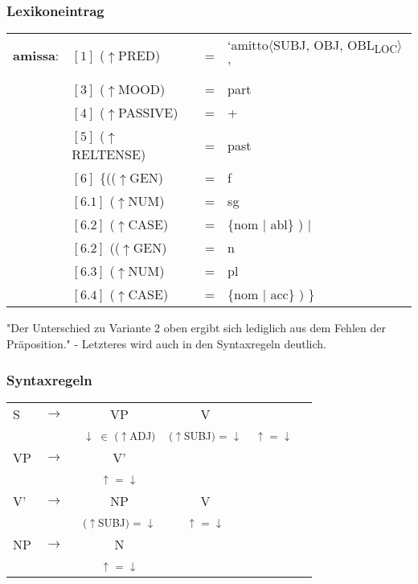 \documentclass[12pt,a4paper]{article}
\begin{document}
\subsubsection{Lexikoneintrag}
\begin{singlespace}
\begin{tabular}{ l  l  l  l  } 
\textbf{amissa}: & $[1]$ \:  ($\uparrow$PRED) & = & `amitto$\langle$SUBJ, OBJ, OBL\textsubscript{LOC}$\rangle$'\\
$\qquad$ & $[3]$ \:  ($\uparrow$MOOD) & = & part\\
$\qquad$ & $[4]$ \:  ($\uparrow$PASSIVE) & = & + \\
$\qquad$ & $[5]$ \:  ($\uparrow$RELTENSE) & = & past \\
$\qquad$ & $[6]$ \:  \{(($\uparrow$GEN) & = & f \\ 
$\qquad$ & $[6.1]$ \:  ($\uparrow$NUM) & = & sg \\
$\qquad$ & $[6.2]$ \:  ($\uparrow$CASE) & = & \{nom $\mid$ abl\} ) $\mid$\\
$\qquad$ & $[6.2]$ \: (($\uparrow$GEN) & = & n \\
$\qquad$ & $[6.3]$ \:  ($\uparrow$NUM) & = & pl \\
$\qquad$ & $[6.4]$ \:  ($\uparrow$CASE) & = & \{nom $\mid$ acc\} ) \}\\
\end{tabular}
\newline
\newline
\end{singlespace}

"Der Unterschied zu Variante 2 oben ergibt sich lediglich aus dem Fehlen der Präposition." - Letzteres wird auch in den Syntaxregeln deutlich.

\subsubsection{Syntaxregeln}
\begin{singlespace}
\begin{tabular}{ l  l  c  c  c  c }
  S & $\rightarrow$ & VP & V\\
   & $\qquad$ & \textsuperscript{$\downarrow$ $\in$ ($\uparrow$ADJ)} & \textsuperscript{($\uparrow$SUBJ) = $\downarrow$} & \textsuperscript{$\uparrow$ = $\downarrow$} \\
	    VP & $\rightarrow$ & V' \\
   & $\qquad$ & \textsuperscript{$\uparrow$ = $\downarrow$} \\
			  V' & $\rightarrow$ & NP& V \\
   & $\qquad$ & \textsuperscript{($\uparrow$SUBJ) = $\downarrow$} &\textsuperscript{$\uparrow$ = $\downarrow$} \\
		   					 NP & $\rightarrow$ & N \\
   & $\qquad$ & \textsuperscript{$\uparrow$ = $\downarrow$} \\
\end{tabular} 
\newline
\end{singlespace}
\end{document}
